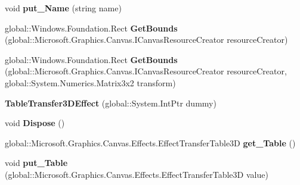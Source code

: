 \begin{DoxyCompactItemize}
void {\bfseries put\+\_\+\+Name} (string name)
\item 
\mbox{\label{class_microsoft_1_1_graphics_1_1_canvas_1_1_effects_1_1_table_transfer3_d_effect_af2b350f1269e83b795233803c6f61283}} 
global\+::\+Windows.\+Foundation.\+Rect {\bfseries Get\+Bounds} (global\+::\+Microsoft.\+Graphics.\+Canvas.\+I\+Canvas\+Resource\+Creator resource\+Creator)
\item 
\mbox{\label{class_microsoft_1_1_graphics_1_1_canvas_1_1_effects_1_1_table_transfer3_d_effect_af079ef57539db85abe983a0d4859ce4d}} 
global\+::\+Windows.\+Foundation.\+Rect {\bfseries Get\+Bounds} (global\+::\+Microsoft.\+Graphics.\+Canvas.\+I\+Canvas\+Resource\+Creator resource\+Creator, global\+::\+System.\+Numerics.\+Matrix3x2 transform)
\item 
\mbox{\label{class_microsoft_1_1_graphics_1_1_canvas_1_1_effects_1_1_table_transfer3_d_effect_af9a5033370f8687d7d67be5b377d59e5}} 
{\bfseries Table\+Transfer3\+D\+Effect} (global\+::\+System.\+Int\+Ptr dummy)
\item 
\mbox{\label{class_microsoft_1_1_graphics_1_1_canvas_1_1_effects_1_1_table_transfer3_d_effect_a8fea9844c0b93747df6430c49d676897}} 
void {\bfseries Dispose} ()
\item 
\mbox{\label{class_microsoft_1_1_graphics_1_1_canvas_1_1_effects_1_1_table_transfer3_d_effect_a8479c991b8673215ffa620b727b809f2}} 
global\+::\+Microsoft.\+Graphics.\+Canvas.\+Effects.\+Effect\+Transfer\+Table3D {\bfseries get\+\_\+\+Table} ()
\item 
\mbox{\label{class_microsoft_1_1_graphics_1_1_canvas_1_1_effects_1_1_table_transfer3_d_effect_aa43aa9c3e770ae4bd2b2ea28e4c714d2}} 
void {\bfseries put\+\_\+\+Table} (global\+::\+Microsoft.\+Graphics.\+Canvas.\+Effects.\+Effect\+Transfer\+Table3D value)
\item 

\end{DoxyCompactItemize}
